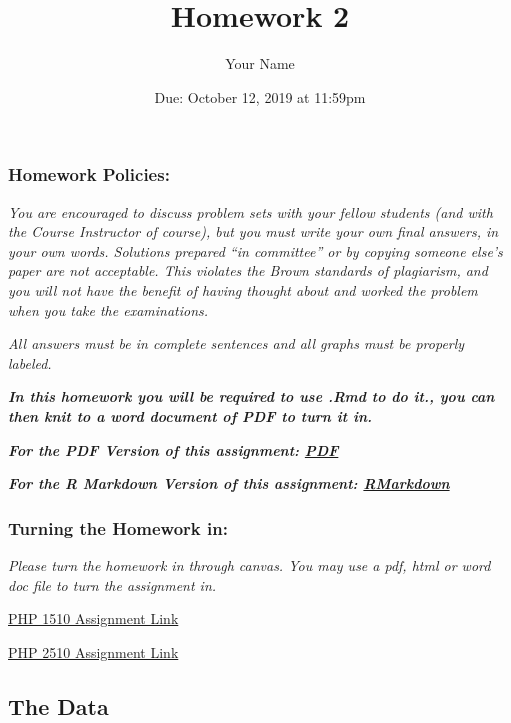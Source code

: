\documentclass[]{article}
\title{Homework 2}
\author{Your Name}
\date{Due: October 12, 2019 at 11:59pm}
\begin{document}
\maketitle

\subsubsection{Homework Policies:}\label{homework-policies}

\emph{You are encouraged to discuss problem sets with your fellow
students (and with the Course Instructor of course), but you must write
your own final answers, in your own words. Solutions prepared ``in
committee'' or by copying someone else's paper are not acceptable. This
violates the Brown standards of plagiarism, and you will not have the
benefit of having thought about and worked the problem when you take the
examinations.}

\emph{All answers must be in complete sentences and all graphs must be
properly labeled.}

\textbf{\emph{In this homework you will be required to use .Rmd to do
it., you can then knit to a word document of PDF to turn it in.}}

\textbf{\emph{For the PDF Version of this assignment:
\href{https://raw.githubusercontent.com/php-1510-2510/php-1510-2510.github.io/master/homework/hw2.pdf}{PDF}}}

\textbf{\emph{For the R Markdown Version of this assignment:
\href{https://raw.githubusercontent.com/php-1510-2510/php-1510-2510.github.io/master/homework/hw2.Rmd}{RMarkdown}}}

\subsubsection{Turning the Homework in:}\label{turning-the-homework-in}

\emph{Please turn the homework in through canvas. You may use a pdf,
html or word doc file to turn the assignment in.}

\href{https://canvas.brown.edu/courses/1078851/assignments/7744738}{PHP
1510 Assignment Link}

\href{https://canvas.brown.edu/courses/1078852/assignments/7744739}{PHP
2510 Assignment Link}

\subsection{The Data}\label{the-data}
\end{document}
